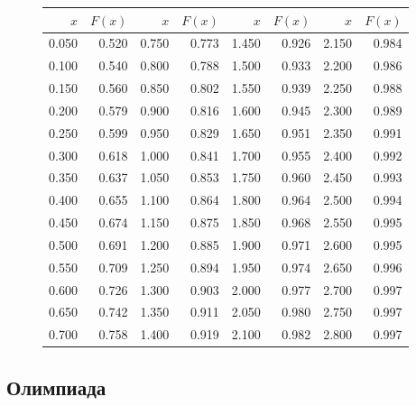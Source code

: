 \documentclass[addpoints, answers]{exam} %
\begin{document}
\begin{figure}[b]
\begin{minipage}[b]{0.35\linewidth}
\begin{tikzpicture}
\end{tikzpicture}
\par\vspace{0pt}
  \end{minipage}%
  \begin{minipage}[b]{0.60\linewidth}
    \centering
\begin{tabular}{rr|rr|rr|rr}
  \hline
$x$ & $F(x)$ & $x$ & $F(x)$ & $x$ & $F(x)$ & $x$ & $F(x)$ \\
  \hline
0.050 & 0.520 & 0.750 & 0.773 & 1.450 & 0.926 & 2.150 & 0.984 \\
  0.100 & 0.540 & 0.800 & 0.788 & 1.500 & 0.933 & 2.200 & 0.986 \\
  0.150 & 0.560 & 0.850 & 0.802 & 1.550 & 0.939 & 2.250 & 0.988 \\
  0.200 & 0.579 & 0.900 & 0.816 & 1.600 & 0.945 & 2.300 & 0.989 \\
  0.250 & 0.599 & 0.950 & 0.829 & 1.650 & 0.951 & 2.350 & 0.991 \\
  0.300 & 0.618 & 1.000 & 0.841 & 1.700 & 0.955 & 2.400 & 0.992 \\
  0.350 & 0.637 & 1.050 & 0.853 & 1.750 & 0.960 & 2.450 & 0.993 \\
  0.400 & 0.655 & 1.100 & 0.864 & 1.800 & 0.964 & 2.500 & 0.994 \\
  0.450 & 0.674 & 1.150 & 0.875 & 1.850 & 0.968 & 2.550 & 0.995 \\
  0.500 & 0.691 & 1.200 & 0.885 & 1.900 & 0.971 & 2.600 & 0.995 \\
  0.550 & 0.709 & 1.250 & 0.894 & 1.950 & 0.974 & 2.650 & 0.996 \\
  0.600 & 0.726 & 1.300 & 0.903 & 2.000 & 0.977 & 2.700 & 0.997 \\
  0.650 & 0.742 & 1.350 & 0.911 & 2.050 & 0.980 & 2.750 & 0.997 \\
  0.700 & 0.758 & 1.400 & 0.919 & 2.100 & 0.982 & 2.800 & 0.997 \\
   \hline
\end{tabular}
\par\vspace{0pt}
\end{minipage}
\label{fig:test}
\end{figure}


\newpage

\subsection{Олимпиада}
\end{document}
